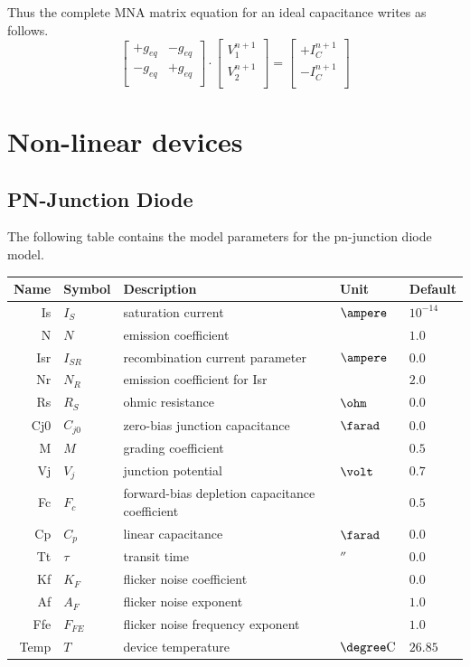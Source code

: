 \documentclass[10pt]{report}
\begin{document}
Thus the complete MNA matrix equation for an ideal capacitance writes
as follows.
\begin{equation}
\begin{bmatrix}
+g_{eq} & -g_{eq}\\
-g_{eq} & +g_{eq}\\
\end{bmatrix}
\cdot
\begin{bmatrix}
V_1^{n+1}\\
V_2^{n+1}\\
\end{bmatrix}
=
\begin{bmatrix}
+I_C^{n+1}\\
-I_C^{n+1}\\
\end{bmatrix}
\end{equation}

\chapter{Non-linear devices}
\label{sec:NLdevices}

\section{PN-Junction Diode}

The following table contains the model parameters for the pn-junction
diode model.

\addvspace{12pt}

\begin{tabular}{rllll}
Name & Symbol & Description & Unit & Default\\
\hline
Is & $I_{S}$ & saturation current & $\ampere$ & $10^{-14}$\\
N & $N$ & emission coefficient & & $1.0$\\
Isr & $I_{SR}$ & recombination current parameter & $\ampere$ & $0.0$\\
Nr & $N_{R}$ & emission coefficient for Isr & & $2.0$\\
Rs & $R_{S}$ & ohmic resistance & $\ohm$ & $0.0$\\
Cj0 & $C_{j0}$ & zero-bias junction capacitance & $\farad$ & $0.0$\\
M & $M$ & grading coefficient & & $0.5$\\
Vj & $V_{j}$ & junction potential & $\volt$ & $0.7$\\
Fc & $F_{c}$ & forward-bias depletion capacitance coefficient & & $0.5$\\
Cp & $C_{p}$ & linear capacitance & $\farad$ & $0.0$\\
Tt & $\tau$ & transit time & $\second$ & $0.0$\\
Kf & $K_F$ & flicker noise coefficient & & $0.0$\\
Af & $A_F$ & flicker noise exponent & & $1.0$\\
Ffe & $F_{FE}$ & flicker noise frequency exponent & & $1.0$\\
Temp & $T$ & device temperature & $\degree \mathrm{C}$ & $26.85$
\end{tabular}
\end{document}
